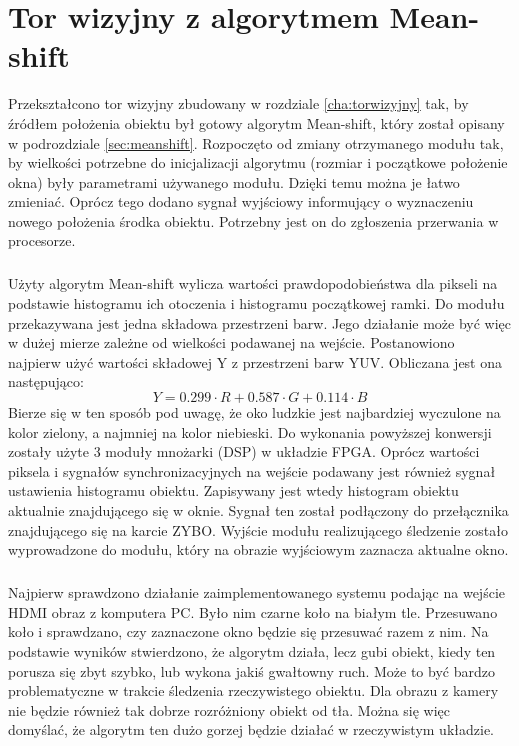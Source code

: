 \chapter{Tor wizyjny z algorytmem Mean-shift}
\label{cha:torwizyjnyzalgorytmemmeanshift}

Przekształcono tor wizyjny zbudowany w rozdziale \ref{cha:torwizyjny} tak, by źródłem położenia obiektu był gotowy algorytm Mean-shift, który został opisany w podrozdziale \ref{sec:meanshift}. 
Rozpoczęto od zmiany otrzymanego modułu tak, by wielkości potrzebne do inicjalizacji algorytmu (rozmiar i początkowe położenie okna) były parametrami używanego modułu. Dzięki temu można je łatwo zmieniać.
Oprócz tego dodano sygnał wyjściowy informujący o wyznaczeniu nowego położenia środka obiektu. Potrzebny jest on do zgłoszenia przerwania w procesorze.

\paragraph*{}
Użyty algorytm Mean-shift wylicza wartości prawdopodobieństwa dla pikseli na podstawie histogramu ich otoczenia i histogramu początkowej ramki. Do modułu przekazywana jest jedna składowa przestrzeni barw.
Jego działanie może być więc w dużej mierze zależne od wielkości podawanej na wejście.
Postanowiono najpierw użyć wartości składowej Y z przestrzeni barw YUV.
Obliczana jest ona następująco:
\begin{equation}
\label{eq:grayscale}
Y=0.299 \cdot R+0.587 \cdot G+0.114 \cdot B
\end{equation}
Bierze się w ten sposób pod uwagę, że oko ludzkie jest najbardziej wyczulone na kolor zielony, a najmniej na kolor niebieski. 
Do wykonania powyższej konwersji zostały użyte 3 moduły mnożarki (DSP) w układzie FPGA.
Oprócz wartości piksela i sygnałów synchronizacyjnych na wejście podawany jest również sygnał ustawienia histogramu obiektu. 
Zapisywany jest wtedy histogram obiektu aktualnie znajdującego się w oknie. 
Sygnał ten został podłączony do przełącznika znajdującego się na karcie ZYBO. 
Wyjście modułu realizującego śledzenie zostało wyprowadzone do modułu, który na obrazie wyjściowym zaznacza aktualne okno.

\paragraph*{}
Najpierw sprawdzono działanie zaimplementowanego systemu podając na wejście HDMI obraz z komputera PC. 
Było nim czarne koło na białym tle. 
Przesuwano koło i sprawdzano, czy zaznaczone okno będzie się przesuwać razem z nim. 
Na podstawie wyników stwierdzono, że algorytm działa, lecz gubi obiekt, kiedy ten porusza się zbyt szybko, lub wykona jakiś gwałtowny ruch. 
Może to być bardzo problematyczne w trakcie śledzenia rzeczywistego obiektu. 
Dla obrazu z kamery nie będzie również tak dobrze rozróżniony obiekt od tła. 
Można się więc domyślać, że algorytm ten dużo gorzej będzie działać w rzeczywistym układzie.

